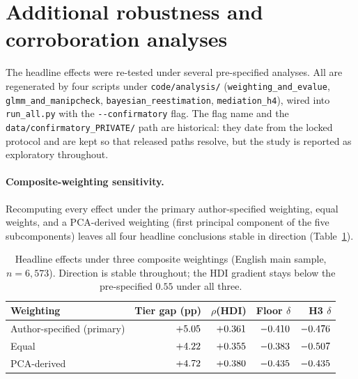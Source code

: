 \documentclass[11pt,a4paper]{article}
\begin{document}
\section{Additional robustness and corroboration analyses}\label{sec:s-extra}

{\sloppy The headline effects were re-tested under several pre-specified
analyses. All are regenerated by four scripts under \texttt{code/analysis/}
(\texttt{weighting\_and\_evalue}, \texttt{glmm\_and\_manipcheck},
\texttt{bayesian\_reestimation}, \texttt{mediation\_h4}), wired into
\texttt{run\_all.py} with the \texttt{-{}-confirmatory} flag. The flag name and the \texttt{data/confirmatory\_PRIVATE/} path are historical: they date from the locked protocol and are kept so that released paths resolve, but the study is reported as exploratory throughout.\par}

\paragraph{Composite-weighting sensitivity.}\label{sec:s-weighting} Recomputing every effect under the
primary author-specified weighting, equal weights, and a PCA-derived weighting
(first principal component of the five subcomponents) leaves all four headline
conclusions stable in direction (Table~\ref{tab:s-weighting}).

\begin{table}[h]\centering
\caption{Headline effects under three composite weightings (English main sample,
$n=6{,}573$). Direction is stable throughout; the HDI gradient stays below the
pre-specified $0.55$ under all three.}
\label{tab:s-weighting}
\small
\begin{tabular}{lrrrr}
\toprule
Weighting & Tier gap (pp) & $\rho$(HDI) & Floor $\delta$ & H3 $\delta$ \\
\midrule
Author-specified (primary) & $+5.05$ & $+0.361$ & $-0.410$ & $-0.476$ \\
Equal                      & $+4.22$ & $+0.355$ & $-0.383$ & $-0.507$ \\
PCA-derived                & $+4.72$ & $+0.380$ & $-0.435$ & $-0.435$ \\
\bottomrule
\end{tabular}
\end{table}
\end{document}
